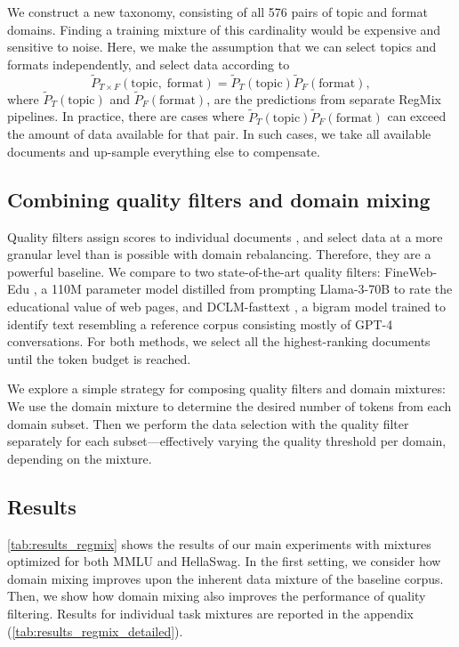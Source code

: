 We construct a new taxonomy, consisting of all 576 pairs of topic and format domains.
Finding a training mixture of this cardinality would be expensive and sensitive to noise.
Here, we make the assumption that we can select topics and formats independently, and select data according to 
$$\tilde P_{T \times F}(\text{topic},\;\text{format}) = \tilde P_{T}(\text{topic})\tilde P_{F}(\text{format}),$$ 
where {$\tilde P_{T}(\text{topic})$} and {$\tilde P_{F}(\text{format})$}, are the predictions from separate RegMix pipelines. 
In practice, there are cases where $\tilde P_{T}(\text{topic})\tilde P_{F}(\text{format})$ can exceed the amount of data available for that pair.
In such cases, we take all available documents and up-sample everything else to compensate.

\subsection{Combining quality filters and domain mixing}
Quality filters assign scores to individual documents \citep{xie2023data, wettig2024qurating, sachdeva2024train}, and select data at a more granular level than is possible with domain rebalancing. 
Therefore, they are a powerful baseline. We compare to two state-of-the-art quality filters: FineWeb-Edu \citep{penedo2024finewebdatasetsdecantingweb}, a 110M parameter model distilled from prompting Llama-3-70B to rate the educational value of web pages, and DCLM-fasttext \citep{li2024datacomplm}, a bigram model trained to identify text resembling a reference corpus consisting mostly of GPT-4 conversations. For both methods, we select all the highest-ranking documents until the token budget is reached.

We explore a simple strategy for composing quality filters and domain mixtures: We use the domain mixture to determine the desired number of tokens from each domain subset. Then we perform the data selection with the quality filter separately for each subset---effectively varying the quality threshold per domain, depending on the mixture.

\subsection{Results}
\autoref{tab:results_regmix} shows the results of our main experiments with mixtures optimized for both MMLU and HellaSwag. In the first setting, we consider how domain mixing improves upon the inherent data mixture of the baseline corpus. 
Then, we show how domain mixing also improves the performance of quality filtering. 
Results for individual task mixtures are reported in the appendix (\autoref{tab:results_regmix_detailed}).


